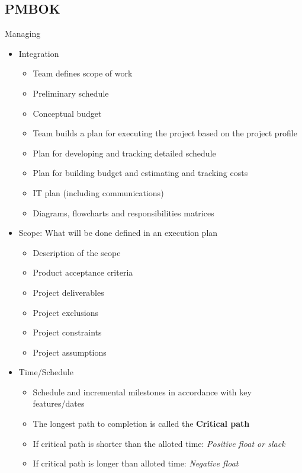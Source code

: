 \documentclass[12pt]{report}
\begin{document}
\subsection{PMBOK}
  Managing
  \begin{itemize}
    \item Integration
          \begin{itemize}
              \item Team defines scope of work
              \item Preliminary schedule
              \item Conceptual budget
              \item Team builds a plan for executing the project based on the project profile
              \item Plan for developing and tracking detailed schedule
              \item Plan for building budget and estimating and tracking costs
              \item IT plan (including communications)
              \item Diagrams, flowcharts and responsibilities matrices
          \end{itemize}
    \item Scope: What will be done defined in an execution plan
          \begin{itemize}
                  \item Description of the scope
                  \item Product acceptance criteria
                  \item Project deliverables
                  \item Project exclusions
                  \item Project constraints
                  \item Project assumptions
          \end{itemize}
    \item Time/Schedule
          \begin{itemize}
            \item Schedule and incremental milestones in accordance with key features/dates
            \item The longest path to completion is called the \textbf{Critical path}
                  \item If critical path is shorter than the alloted time: \textit{Positive float or slack}
            \item If critical path is longer than alloted time: \textit{Negative float}


\end{itemize}
\end{itemize}
\end{document}
